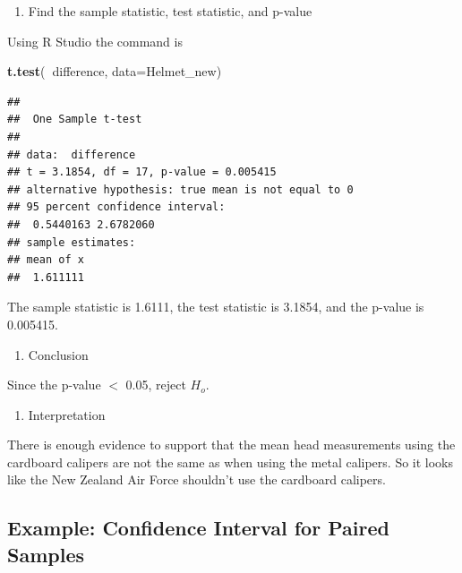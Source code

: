 \documentclass[
]{book}
\newenvironment{Shaded}{\begin{snugshade}}{\end{snugshade}}
\newcommand{\DataTypeTok}[1]{\textcolor[rgb]{0.13,0.29,0.53}{#1}}
\newcommand{\KeywordTok}[1]{\textcolor[rgb]{0.13,0.29,0.53}{\textbf{#1}}}
\newcommand{\NormalTok}[1]{#1}
\newcommand{\OperatorTok}[1]{\textcolor[rgb]{0.81,0.36,0.00}{\textbf{#1}}}
\providecommand{\tightlist}{%
  \setlength{\itemsep}{0pt}\setlength{\parskip}{0pt}}
\begin{document}
\begin{enumerate}
\def\labelenumi{\arabic{enumi}.}
\setcounter{enumi}{3}
\tightlist
\item
  Find the sample statistic, test statistic, and p-value
\end{enumerate}

Using R Studio the command is

\begin{Shaded}
\begin{Highlighting}[]
\KeywordTok{t.test}\NormalTok{(}\OperatorTok{~}\NormalTok{difference, }\DataTypeTok{data=}\NormalTok{Helmet_new)}
\end{Highlighting}
\end{Shaded}

\begin{verbatim}
## 
##  One Sample t-test
## 
## data:  difference
## t = 3.1854, df = 17, p-value = 0.005415
## alternative hypothesis: true mean is not equal to 0
## 95 percent confidence interval:
##  0.5440163 2.6782060
## sample estimates:
## mean of x 
##  1.611111
\end{verbatim}

The sample statistic is 1.6111, the test statistic is 3.1854, and the p-value is 0.005415.

\begin{enumerate}
\def\labelenumi{\arabic{enumi}.}
\setcounter{enumi}{4}
\tightlist
\item
  Conclusion
\end{enumerate}

Since the p-value \(<\) 0.05, reject \(H_o\).

\begin{enumerate}
\def\labelenumi{\arabic{enumi}.}
\setcounter{enumi}{5}
\tightlist
\item
  Interpretation
\end{enumerate}

There is enough evidence to support that the mean head measurements using the cardboard calipers are not the same as when using the metal calipers. So it looks like the New Zealand Air Force shouldn't use the cardboard calipers.

\hypertarget{example-confidence-interval-for-paired-samples}{%
\subsection{Example: Confidence Interval for Paired Samples}\label{example-confidence-interval-for-paired-samples}}
\end{document}
